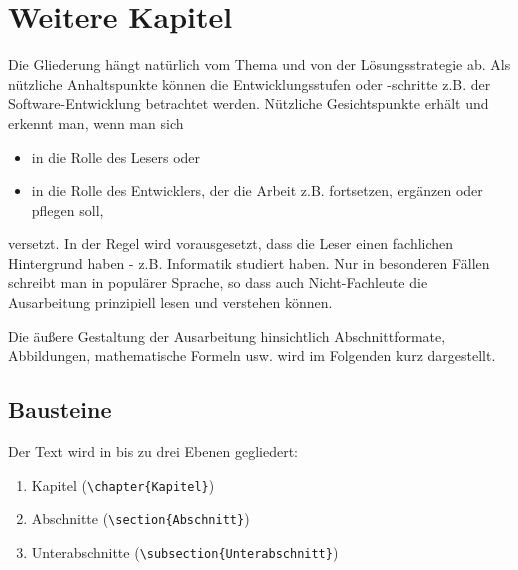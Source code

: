 \chapter{Weitere Kapitel}

Die Gliederung hängt natürlich vom Thema und von der Lösungsstrategie ab. Als nützliche Anhaltspunkte können die Entwicklungsstufen oder -schritte z.B. der Software-Entwicklung betrachtet werden. Nützliche Gesichtspunkte erhält und erkennt man, wenn man sich

\begin{itemize}
	\item in die Rolle des Lesers oder
	\item in die Rolle des Entwicklers, der die Arbeit z.B. fortsetzen, ergänzen oder pflegen soll,
\end{itemize}

versetzt. In der Regel wird vorausgesetzt, dass die Leser einen fachlichen Hintergrund haben - z.B. Informatik studiert haben. Nur in besonderen Fällen schreibt man in populärer Sprache, so dass auch Nicht-Fachleute die Ausarbeitung prinzipiell lesen und verstehen können.

Die äußere Gestaltung der Ausarbeitung hinsichtlich Abschnittformate, Abbildungen, mathematische Formeln usw. wird im Folgenden kurz dargestellt.

\section{Bausteine}\label{Bausteine}

Der Text wird in bis zu drei Ebenen gegliedert:

\begin{enumerate}
	\item Kapitel (\verb|\chapter{Kapitel}|)
	\item Abschnitte (\verb|\section{Abschnitt}|)
	\item Unterabschnitte (\verb|\subsection{Unterabschnitt}|)
\end{enumerate}


